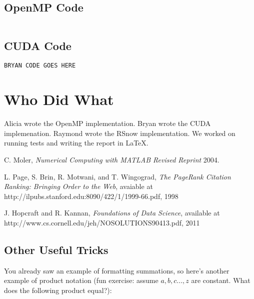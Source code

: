 \documentclass[11pt,letterpaper]{article}
\begin{document}
\subsection{OpenMP Code}
\begin{lstlisting}[style=MyC++Style]

\end{lstlisting}

\subsection{CUDA Code}
\begin{lstlisting}[style=MyC++Style]
BRYAN CODE GOES HERE
\end{lstlisting}

\section{Who Did What} \label{App:AppendixB}

Alicia wrote the OpenMP implementation. Bryan wrote the CUDA implemenation. Raymond wrote the RSnow implementation. We worked on running tests and writing the report in  \LaTeX.

\newpage

\begin{thebibliography}{1}

   C. Moler, {\em Numerical Computing with MATLAB Revised Reprint}  2004.

    L. Page, S. Brin, R. Motwani, and T. Wingograd, {\em The PageRank Citation Ranking: Bringing Order to the Web}, avaiable at http://ilpubs.stanford.edu:8090/422/1/1999-66.pdf,	1998

    J. Hopcraft and R. Kannan, {\em Foundations of Data Science}, available at http://www.cs.cornell.edu/jeh/NOSOLUTIONS90413.pdf, 2011

\end{thebibliography}

\iffalse
\subsection{Other Useful Tricks}
You already saw an example of formatting summations, so here's another example of product notation
(fun exercise: assume $a,b,c...,z$ are constant.  What does the following product equal?):
\end{document}
